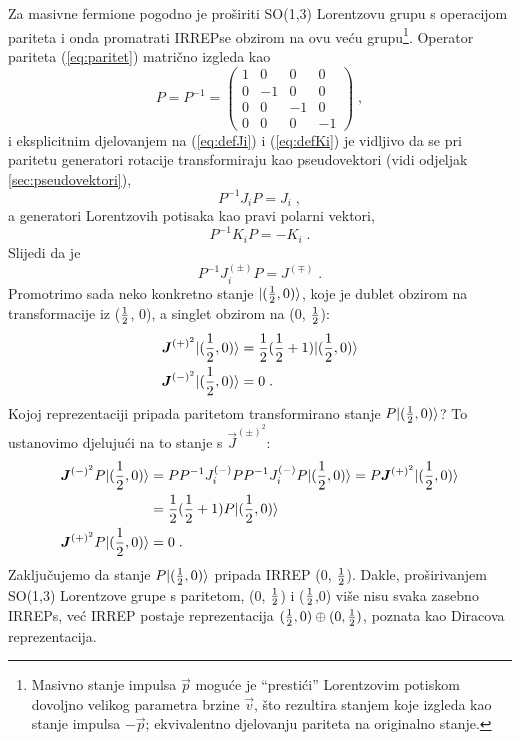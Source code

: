 Za masivne fermione pogodno je proširiti SO(1,3) Lorentzovu
grupu s operacijom pariteta i onda promatrati IRREPse obzirom
na ovu veću grupu\footnote{Masivno stanje impulsa $\vec{p}$
moguće je ``prestići'' Lorentzovim potiskom dovoljno velikog
parametra brzine $\vec{v}$, što rezultira stanjem koje izgleda
kao stanje impulsa $-\vec{p}$; ekvivalentno djelovanju pariteta
na originalno stanje.}. Operator pariteta (\ref{eq:paritet}) 
matrično izgleda kao
\begin{equation}
 P = P^{-1} =
\begin{pmatrix}
1 & 0 & 0 & 0 \\
0 & -1 & 0 & 0 \\
0 & 0 & -1 & 0 \\
0 & 0 & 0 & -1
\end{pmatrix} \;,
\end{equation}
i eksplicitnim djelovanjem na (\ref{eq:defJi}) i (\ref{eq:defKi}) 
je vidljivo da se pri paritetu generatori rotacije
transformiraju kao pseudovektori (vidi odjeljak \ref{sec:pseudovektori}),
\begin{equation}
   P^{-1} J_i P = J_i \;,
\end{equation}
a generatori Lorentzovih potisaka kao pravi polarni vektori,
\begin{equation}
   P^{-1} K_i P = - K_i \;.
\end{equation}
Slijedi da je 
\begin{equation}
 P^{-1} J^{(\pm)}_i P = J^{(\mp)} \;.
\end{equation}
Promotrimo sada neko konkretno stanje $| (\frac{1}{2},0) \rangle$, koje je 
dublet obzirom na transformacije iz ($\frac{1}{2}$, 0), 
a singlet obzirom na (0, $\frac{1}{2}$):
\begin{align}
\vec{J}^{(+)^2} \ket{(\fhalf,0)}& = \fhalf(\fhalf+1) \ket{(\fhalf,0)} \\
\vec{J}^{(-)^2} \ket{(\fhalf,0)}& = 0 \;.
\end{align}
Kojoj reprezentaciji pripada paritetom transformirano stanje
$P | (\frac{1}{2},0) \rangle$? To ustanovimo djelujući na to stanje
s $\vec{J}^{(\pm)^2}$:
\begin{align}
\vec{J}^{(-)^2} P \ket{(\fhalf,0)}& = 
P P^{-1} J^{(-)}_i P P^{-1} J^{(-)}_i P \ket{(\fhalf,0)}
= P \vec{J}^{(+)^2} \ket{(\fhalf,0)}  \nonumber \\
  & = \fhalf(\fhalf+1) P \ket{(\fhalf,0)} \\
\vec{J}^{(+)^2} P \ket{(\fhalf,0)}& = 0 \;.
\end{align}
Zaključujemo da stanje $P | (\frac{1}{2},0) \rangle$ pripada IRREP (0, $\frac{1}{2}$).
Dakle, proširivanjem SO(1,3) Lorentzove grupe s paritetom,
(0, $\frac{1}{2}$) i ($\frac{1}{2}$,0) više nisu svaka zasebno IRREPs, već
IRREP postaje reprezentacija $(\frac{1}{2}, 0) \oplus (0, \frac{1}{2})$, poznata
kao Diracova reprezentacija.


